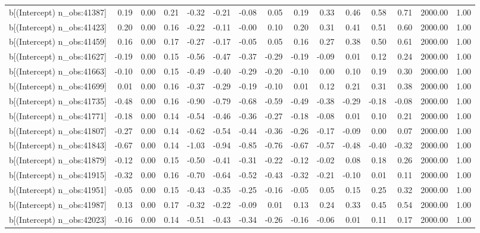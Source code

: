 \begin{table}[ht]
\begin{tabular}{rrrrrrrrrrrrrrr}
  b[(Intercept) n\_obs:41387] & 0.19 & 0.00 & 0.21 & -0.32 & -0.21 & -0.08 & 0.05 & 0.19 & 0.33 & 0.46 & 0.58 & 0.71 & 2000.00 & 1.00 \\ 
  b[(Intercept) n\_obs:41423] & 0.20 & 0.00 & 0.16 & -0.22 & -0.11 & -0.00 & 0.10 & 0.20 & 0.31 & 0.41 & 0.51 & 0.60 & 2000.00 & 1.00 \\ 
  b[(Intercept) n\_obs:41459] & 0.16 & 0.00 & 0.17 & -0.27 & -0.17 & -0.05 & 0.05 & 0.16 & 0.27 & 0.38 & 0.50 & 0.61 & 2000.00 & 1.00 \\ 
  b[(Intercept) n\_obs:41627] & -0.19 & 0.00 & 0.15 & -0.56 & -0.47 & -0.37 & -0.29 & -0.19 & -0.09 & 0.01 & 0.12 & 0.24 & 2000.00 & 1.00 \\ 
  b[(Intercept) n\_obs:41663] & -0.10 & 0.00 & 0.15 & -0.49 & -0.40 & -0.29 & -0.20 & -0.10 & 0.00 & 0.10 & 0.19 & 0.30 & 2000.00 & 1.00 \\ 
  b[(Intercept) n\_obs:41699] & 0.01 & 0.00 & 0.16 & -0.37 & -0.29 & -0.19 & -0.10 & 0.01 & 0.12 & 0.21 & 0.31 & 0.38 & 2000.00 & 1.00 \\ 
  b[(Intercept) n\_obs:41735] & -0.48 & 0.00 & 0.16 & -0.90 & -0.79 & -0.68 & -0.59 & -0.49 & -0.38 & -0.29 & -0.18 & -0.08 & 2000.00 & 1.00 \\ 
  b[(Intercept) n\_obs:41771] & -0.18 & 0.00 & 0.14 & -0.54 & -0.46 & -0.36 & -0.27 & -0.18 & -0.08 & 0.01 & 0.10 & 0.21 & 2000.00 & 1.00 \\ 
  b[(Intercept) n\_obs:41807] & -0.27 & 0.00 & 0.14 & -0.62 & -0.54 & -0.44 & -0.36 & -0.26 & -0.17 & -0.09 & 0.00 & 0.07 & 2000.00 & 1.00 \\ 
  b[(Intercept) n\_obs:41843] & -0.67 & 0.00 & 0.14 & -1.03 & -0.94 & -0.85 & -0.76 & -0.67 & -0.57 & -0.48 & -0.40 & -0.32 & 2000.00 & 1.00 \\ 
  b[(Intercept) n\_obs:41879] & -0.12 & 0.00 & 0.15 & -0.50 & -0.41 & -0.31 & -0.22 & -0.12 & -0.02 & 0.08 & 0.18 & 0.26 & 2000.00 & 1.00 \\ 
  b[(Intercept) n\_obs:41915] & -0.32 & 0.00 & 0.16 & -0.70 & -0.64 & -0.52 & -0.43 & -0.32 & -0.21 & -0.10 & 0.01 & 0.11 & 2000.00 & 1.00 \\ 
  b[(Intercept) n\_obs:41951] & -0.05 & 0.00 & 0.15 & -0.43 & -0.35 & -0.25 & -0.16 & -0.05 & 0.05 & 0.15 & 0.25 & 0.32 & 2000.00 & 1.00 \\ 
  b[(Intercept) n\_obs:41987] & 0.13 & 0.00 & 0.17 & -0.32 & -0.22 & -0.09 & 0.01 & 0.13 & 0.24 & 0.33 & 0.45 & 0.54 & 2000.00 & 1.00 \\ 
  b[(Intercept) n\_obs:42023] & -0.16 & 0.00 & 0.14 & -0.51 & -0.43 & -0.34 & -0.26 & -0.16 & -0.06 & 0.01 & 0.11 & 0.17 & 2000.00 & 1.00 \\ 

\end{tabular}
\end{table}
